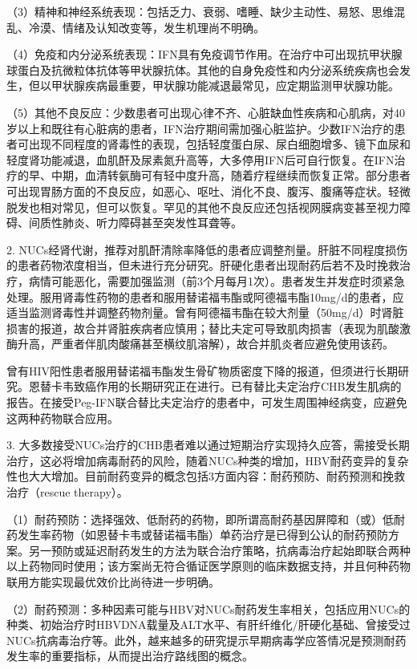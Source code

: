 （3）精神和神经系统表现：包括乏力、衰弱、嗜睡、缺少主动性、易怒、思维混乱、冷漠、情绪及认知改变等，发生机理尚不明确。

（4）免疫和内分泌系统表现：IFN具有免疫调节作用。在治疗中可出现抗甲状腺球蛋白及抗微粒体抗体等甲状腺抗体。其他的自身免疫性和内分泌系统疾病也会发生，但以甲状腺疾病最重要，甲状腺功能减退最常见，应定期监测甲状腺功能。

（5）其他不良反应：少数患者可出现心律不齐、心脏缺血性疾病和心肌病，对40岁以上和既往有心脏病的患者，IFN治疗期间需加强心脏监护。少数IFN治疗的患者可出现不同程度的肾毒性的表现，包括轻度蛋白尿、尿白细胞增多、镜下血尿和轻度肾功能减退，血肌酐及尿素氮升高等，大多停用IFN后可自行恢复。在IFN治疗的早、中期，血清转氨酶可有轻中度升高，随着疗程继续而恢复正常。部分患者可出现胃肠方面的不良反应，如恶心、呕吐、消化不良、腹泻、腹痛等症状。轻微脱发也相对常见，但可以恢复。罕见的其他不良反应还包括视网膜病变甚至视力障碍、间质性肺炎、听力障碍甚至突发性耳聋等。

2.
NUCs经肾代谢，推荐对肌酐清除率降低的患者应调整剂量。肝脏不同程度损伤的患者药物浓度相当，但未进行充分研究。肝硬化患者出现耐药后若不及时挽救治疗，病情可能恶化，需要加强监测（前3个月每月1次）。患者发生并发症时须紧急处理。服用肾毒性药物的患者和服用替诺福韦酯或阿德福韦酯10mg/d的患者，应适当监测肾毒性并调整药物剂量。曾有阿德福韦酯在较大剂量（50mg/d）时肾脏损害的报道，故合并肾脏疾病者应慎用；替比夫定可导致肌肉损害（表现为肌酸激酶升高，严重者伴肌肉酸痛甚至横纹肌溶解），故合并肌炎者应避免使用该药。

曾有HIV阳性患者服用替诺福韦酯发生骨矿物质密度下降的报道，但须进行长期研究。恩替卡韦致癌作用的长期研究正在进行。已有替比夫定治疗CHB发生肌病的报告。在接受Peg-IFN联合替比夫定治疗的患者中，可发生周围神经病变，应避免这两种药物联合应用。

3.
大多数接受NUCs治疗的CHB患者难以通过短期治疗实现持久应答，需接受长期治疗，这必将增加病毒耐药的风险，随着NUCs种类的增加，HBV耐药变异的复杂性也大大增加。目前耐药变异的概念包括3方面内容：耐药预防、耐药预测和挽救治疗（rescue
therapy）。

（1）耐药预防：选择强效、低耐药的药物，即所谓高耐药基因屏障和（或）低耐药发生率药物（如恩替卡韦或替诺福韦酯）单药治疗是已得到公认的耐药预防方案。另一预防或延迟耐药发生的方法为联合治疗策略，抗病毒治疗起始即联合两种以上药物同时使用；该方案尚无符合循证医学原则的临床数据支持，并且何种药物联用方能实现最优效价比尚待进一步明确。

（2）耐药预测：多种因素可能与HBV对NUCs耐药发生率相关，包括应用NUCs的种类、初始治疗时HBVDNA载量及ALT水平、有肝纤维化/肝硬化基础、曾接受过NUCs抗病毒治疗等。此外，越来越多的研究提示早期病毒学应答情况是预测耐药发生率的重要指标，从而提出治疗路线图的概念。

